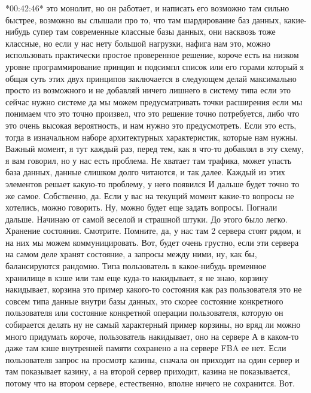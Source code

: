 \documentclass[12pt]{article} %
\begin{document}
*00:42:46*
это монолит, но он работает, и написать его возможно там сильно быстрее, возможно вы слышали про то, что там шардирование баз данных, какие-нибудь супер там современные классные базы данных, они насквозь тоже классные, но если у нас нету большой нагрузки, нафига нам это, можно использовать практически простое проверенное решение, короче есть на низком уровне программирование принцип и подсимпл список или его горами который я общая суть этих двух принципов заключается в следующем делай максимально просто из  возможного и не добавляй ничего лишнего в систему типа если это сейчас нужно системе да мы можем предусматривать точки расширения если мы понимаем что это точно произвел, что это решение точно потребуется, либо что это очень высокая вероятность, и нам нужно это предусмотреть. Если это есть, тогда в изначальном наборе архитектурных характеристик, которые нам нужны. Важный момент, я тут каждый раз, перед тем, как я что-то добавлял в эту схему, я вам говорил, но у нас есть проблема. Не хватает там трафика, может упасть база данных, данные слишком долго читаются, и так далее. Каждый из этих элементов решает какую-то проблему, у него появился И дальше будет точно то же самое.  Собственно, да.  Если у вас на текущий момент какие-то вопросы не хотелись, можно говорить.  Ну, можно будет еще задать вопросы.  Погнали дальше.  Начинаю от самой веселой и страшной штуки.  До этого было легко.  Хранение состояния.  Смотрите.  Помните, да, у нас там 2 сервера стоят рядом, и на них мы можем коммуницировать.  Вот, будет очень грустно, если эти сервера на самом деле хранят состояние, а запросы между ними, ну, как бы, балансируются рандомно.  Типа пользователь в какое-нибудь временное хранилище в кэше или там еще куда-то накидывает, я не знаю, корзину накидывает, корзина это пример какого-то состояния как раз пользователя это не совсем типа данные внутри базы данных, это скорее состояние конкретного пользователя или состояние конкретной операции пользователя, которую он собирается делать ну не самый характерный пример корзины, но вряд ли можно много придумать короче, пользователь накидывает, оно на сервере А в каком-то даже там кэше внутренней памяти сохранено а на сервере FBA ее нет.  Если пользователя запрос на просмотр казины, сначала он приходит на один сервер и там показывает казину, а на второй сервер приходит, казина не показывается, потому что на втором сервере, естественно, вполне ничего не сохранится.  Вот.
\end{document}
